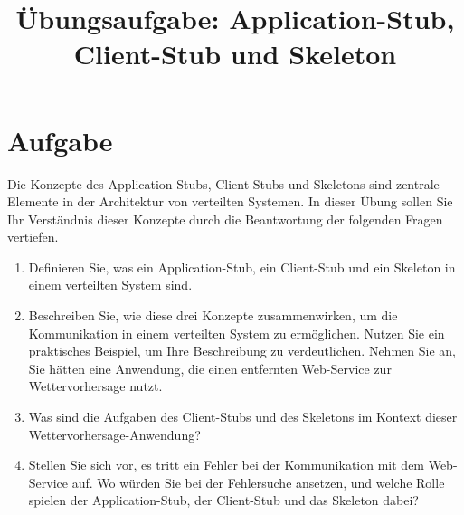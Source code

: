 \documentclass{article}
\begin{document}
\title{Übungsaufgabe: Application-Stub, Client-Stub und Skeleton}
\maketitle

\section*{Aufgabe}

Die Konzepte des Application-Stubs, Client-Stubs und Skeletons sind zentrale Elemente in der Architektur von verteilten Systemen. In dieser Übung sollen Sie Ihr Verständnis dieser Konzepte durch die Beantwortung der folgenden Fragen vertiefen.

\begin{enumerate}
    \item Definieren Sie, was ein Application-Stub, ein Client-Stub und ein Skeleton in einem verteilten System sind.

    \item Beschreiben Sie, wie diese drei Konzepte zusammenwirken, um die Kommunikation in einem verteilten System zu ermöglichen. Nutzen Sie ein praktisches Beispiel, um Ihre Beschreibung zu verdeutlichen. Nehmen Sie an, Sie hätten eine Anwendung, die einen entfernten Web-Service zur Wettervorhersage nutzt. 

    \item Was sind die Aufgaben des Client-Stubs und des Skeletons im Kontext dieser Wettervorhersage-Anwendung?

    \item Stellen Sie sich vor, es tritt ein Fehler bei der Kommunikation mit dem Web-Service auf. Wo würden Sie bei der Fehlersuche ansetzen, und welche Rolle spielen der Application-Stub, der Client-Stub und das Skeleton dabei?

\end{enumerate}
\end{document}
